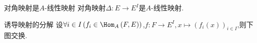 \begin{proposition}{对角映射是$A$-线性映射}{}
	对角映射$\Delta:E\to E^{I}$是$A$-线性映射.
\end{proposition}

\begin{proposition}{诱导映射的分解}{}
	设$\forall i\in I\left(f_{i}\in\Hom_{A}\left(F,E\right)\right)$,$f:F\to E^{I},x\mapsto\left(f_{i}\left(x\right)\right)_{i\in I}$,则下图交换.
	\begin{center}
	\end{center}
\end{proposition}


